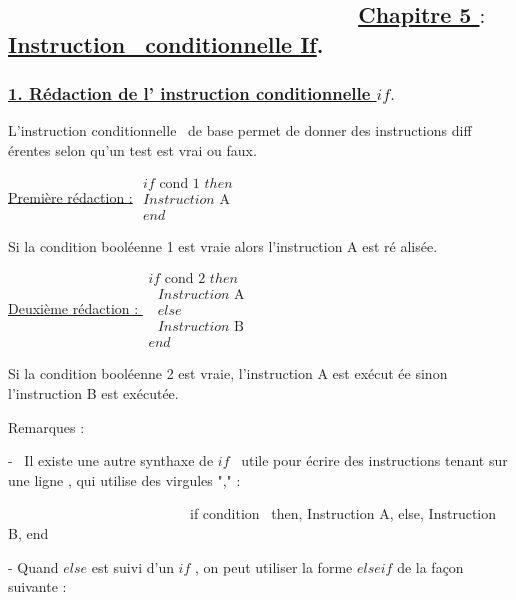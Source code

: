 \documentclass{article}
\begin{document}
\subsection{ \ \ \ \ \ \ \ \ \ \ \ \ \ \ \ \ \ \ \ \ \ \ \ \ \ \ \ \ \ 
\protect\underline{Chapitre 5 $:$ Instruction \ conditionnelle If}.}

\subsubsection{\protect\bigskip \protect\underline{1. R\'{e}daction de l'
instruction conditionnelle $if.$}}

L'instruction conditionnelle \ de base permet de donner des instructions diff%
\'{e}rentes selon qu'un test est vrai ou faux.

\bigskip

\underline{Premi\`{e}re r\'{e}daction :} $%
\begin{array}{c}
if\text{ cond 1 }then \\ 
Instruction\text{ A} \\ 
end%
\end{array}%
$

Si la condition bool\'{e}enne 1 est vraie alors l'instruction A est r\'{e}%
alis\'{e}e.

\bigskip

\underline{Deuxi\`{e}me r\'{e}daction : } $%
\begin{array}{c}
if\text{ cond 2 }then \\ 
\text{ \ \ \ \ \ \ \ \ \ \ \ \ \ \ \ \ \ \ \ \ \ \ \ \ \ \ \ \ }Instruction%
\text{ A } \\ 
\text{ \ }else \\ 
\text{ \ \ \ \ \ \ \ \ \ \ \ \ \ \ \ \ \ \ \ \ \ \ \ \ }Instruction\text{ B}
\\ 
end%
\end{array}%
$

Si la condition bool\'{e}enne 2 est vraie, l'instruction A est ex\'{e}cut%
\'{e}e sinon l'instruction B est ex\'{e}cut\'{e}e.

\bigskip

Remarques :

- \ Il existe une autre synthaxe de $if$ \ utile pour \'{e}crire des
instructions tenant sur une ligne , qui utilise des virgules "," :

\ \ \ \ \ \ \ \ \ \ \ \ \ \ \ \ \ \ \ \ \ \ \ \ \ \ if condition \ then,
Instruction A, else, Instruction B, end

- Quand $else$ est suivi d'un $if$ , on peut utiliser la forme $elseif$ de
la fa\c{c}on suivante :
\end{document}
